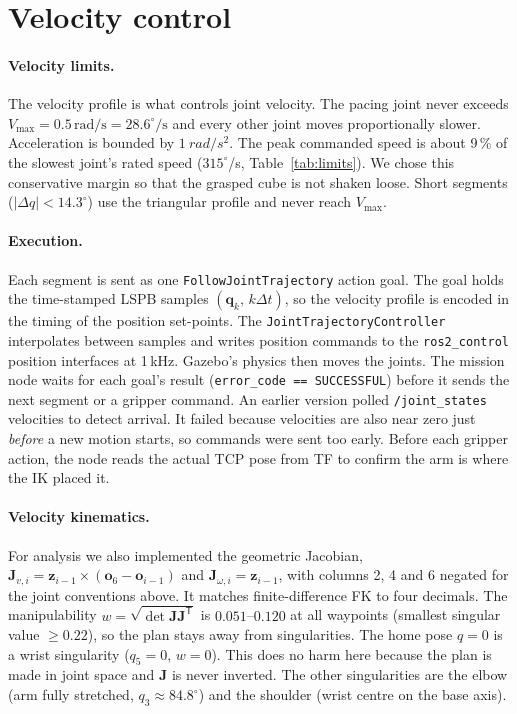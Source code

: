 \documentclass[11pt,a4paper]{article}
\begin{document}
\section{Velocity control}

\paragraph{Velocity limits.}
The velocity profile is what controls joint velocity. The pacing joint never exceeds
\(V_\text{max} = 0.5\,\text{rad/s} = 28.6^\circ/\text{s}\) and every other joint moves
proportionally slower. Acceleration is bounded by \(\SI{1}{rad/s^2}\). The peak commanded
speed is about 9\,\% of the slowest joint's rated speed (\(315^\circ\)/s, Table~\ref{tab:limits}).
We chose this conservative margin so that the grasped cube is not shaken loose. Short
segments (\(|\Delta q| < 14.3^\circ\)) use the triangular profile and never reach
\(V_\text{max}\).

\paragraph{Execution.}
Each segment is sent as one \texttt{FollowJointTrajectory} action goal. The goal holds the
time-stamped LSPB samples \((\mathbf q_k,\, k\Delta t)\), so the velocity profile is encoded
in the timing of the position set-points. The \texttt{JointTrajectoryController}
interpolates between samples and writes position commands to the \texttt{ros2\_control}
position interfaces at 1\,kHz. Gazebo's physics then moves the joints. The mission node
waits for each goal's result (\texttt{error\_code == SUCCESSFUL}) before it sends the next
segment or a gripper command. An earlier version polled \texttt{/joint\_states} velocities
to detect arrival. It failed because velocities are also near zero just \emph{before} a
new motion starts, so commands were sent too early. Before each gripper action, the node
reads the actual TCP pose from TF to confirm the arm is where the IK placed it.

\paragraph{Velocity kinematics.}
For analysis we also implemented the geometric Jacobian,
\(\mathbf J_{v,i} = \mathbf z_{i-1}\times(\mathbf o_6 - \mathbf o_{i-1})\) and
\(\mathbf J_{\omega,i} = \mathbf z_{i-1}\), with columns 2, 4 and 6 negated for the joint
conventions above. It matches finite-difference FK to four decimals. The manipulability
\(w=\sqrt{\det \mathbf J\mathbf J^{\mathsf T}}\) is \(0.051\)--\(0.120\) at all waypoints (smallest
singular value \(\ge 0.22\)), so the plan stays away from singularities. The home pose
\(q=0\) is a wrist singularity (\(q_5=0\), \(w=0\)). This does no harm here because the
plan is made in joint space and \(\mathbf J\) is never inverted. The other singularities
are the elbow (arm fully stretched, \(q_3 \approx 84.8^\circ\)) and the shoulder (wrist centre
on the base axis).
\end{document}
